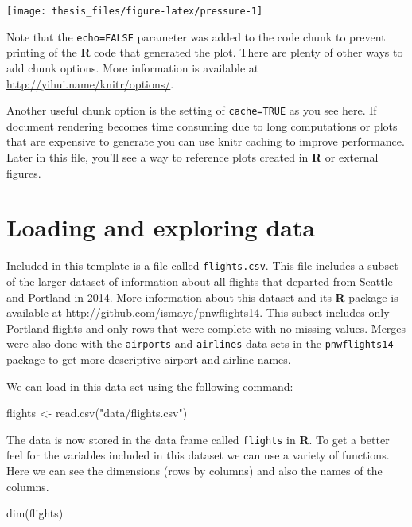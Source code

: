 \documentclass[print]{nuthesis}
\newenvironment{Shaded}{\begin{snugshade}}{\end{snugshade}}
\newcommand{\FunctionTok}[1]{\textcolor[rgb]{0.00,0.00,0.00}{#1}}
\newcommand{\NormalTok}[1]{#1}
\newcommand{\OtherTok}[1]{\textcolor[rgb]{0.56,0.35,0.01}{#1}}
\newcommand{\StringTok}[1]{\textcolor[rgb]{0.31,0.60,0.02}{#1}}
\begin{document}
\texttt{[image: thesis\_files/figure-latex/pressure-1]}

Note that the \texttt{echo=FALSE} parameter was added to the code chunk to prevent printing of the \textbf{R} code that generated the plot. There are plenty of other ways to add chunk options. More information is available at \url{http://yihui.name/knitr/options/}.

Another useful chunk option is the setting of \texttt{cache=TRUE} as you see here. If document rendering becomes time consuming due to long computations or plots that are expensive to generate you can use knitr caching to improve performance. Later in this file, you'll see a way to reference plots created in \textbf{R} or external figures.

\hypertarget{loading-and-exploring-data}{%
\section{Loading and exploring data}\label{loading-and-exploring-data}}

Included in this template is a file called \texttt{flights.csv}. This file includes a subset of the larger dataset of information about all flights that departed from Seattle and Portland in 2014. More information about this dataset and its \textbf{R} package is available at \url{http://github.com/ismayc/pnwflights14}. This subset includes only Portland flights and only rows that were complete with no missing values. Merges were also done with the \texttt{airports} and \texttt{airlines} data sets in the \texttt{pnwflights14} package to get more descriptive airport and airline names.

We can load in this data set using the following command:

\begin{Shaded}
\begin{Highlighting}[]
\NormalTok{flights }\OtherTok{\textless{}{-}} \FunctionTok{read.csv}\NormalTok{(}\StringTok{"data/flights.csv"}\NormalTok{)}
\end{Highlighting}
\end{Shaded}

The data is now stored in the data frame called \texttt{flights} in \textbf{R}. To get a better feel for the variables included in this dataset we can use a variety of functions. Here we can see the dimensions (rows by columns) and also the names of the columns.

\begin{Shaded}
\begin{Highlighting}[]
\FunctionTok{dim}\NormalTok{(flights)}
\end{Highlighting}
\end{Shaded}
\end{document}
